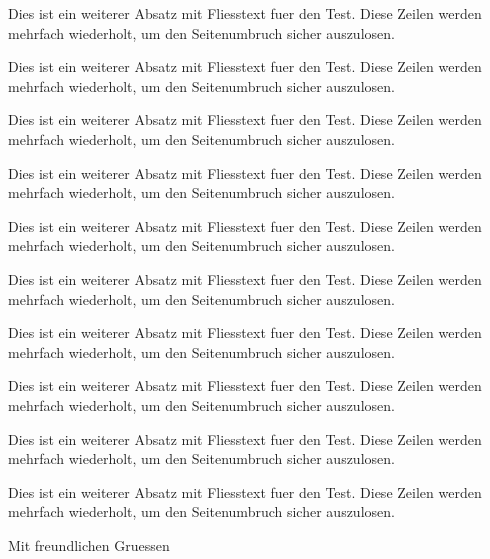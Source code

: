 \documentclass[basic]{../../onlinebrief24}
\begin{document}
\begin{letter}{}
\par Dies ist ein weiterer Absatz mit Fliesstext fuer den Test. Diese Zeilen werden mehrfach wiederholt, um den Seitenumbruch sicher auszulosen.
\par Dies ist ein weiterer Absatz mit Fliesstext fuer den Test. Diese Zeilen werden mehrfach wiederholt, um den Seitenumbruch sicher auszulosen.
\par Dies ist ein weiterer Absatz mit Fliesstext fuer den Test. Diese Zeilen werden mehrfach wiederholt, um den Seitenumbruch sicher auszulosen.
\par Dies ist ein weiterer Absatz mit Fliesstext fuer den Test. Diese Zeilen werden mehrfach wiederholt, um den Seitenumbruch sicher auszulosen.
\par Dies ist ein weiterer Absatz mit Fliesstext fuer den Test. Diese Zeilen werden mehrfach wiederholt, um den Seitenumbruch sicher auszulosen.
\par Dies ist ein weiterer Absatz mit Fliesstext fuer den Test. Diese Zeilen werden mehrfach wiederholt, um den Seitenumbruch sicher auszulosen.
\par Dies ist ein weiterer Absatz mit Fliesstext fuer den Test. Diese Zeilen werden mehrfach wiederholt, um den Seitenumbruch sicher auszulosen.
\par Dies ist ein weiterer Absatz mit Fliesstext fuer den Test. Diese Zeilen werden mehrfach wiederholt, um den Seitenumbruch sicher auszulosen.
\par Dies ist ein weiterer Absatz mit Fliesstext fuer den Test. Diese Zeilen werden mehrfach wiederholt, um den Seitenumbruch sicher auszulosen.
\par Dies ist ein weiterer Absatz mit Fliesstext fuer den Test. Diese Zeilen werden mehrfach wiederholt, um den Seitenumbruch sicher auszulosen.

\closing{Mit freundlichen Gruessen}
\end{letter}
\end{document}
